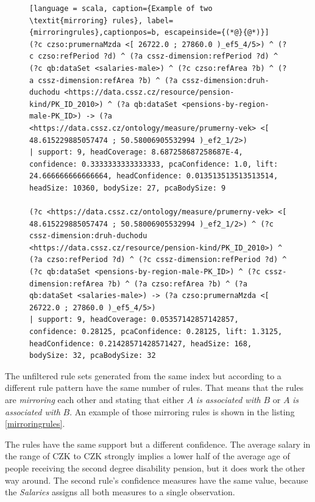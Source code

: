 \begin{figure}[h]
\begin{lstlisting}[language = scala, caption={Example of two \textit{mirroring} rules}, label={mirroringrules},captionpos=b, escapeinside={(*@}{@*)}]
(?c czso:prumernaMzda <[ 26722.0 ; 27860.0 )_ef5_4/5>) ^ (?c czso:refPeriod ?d) ^ (?a cssz-dimension:refPeriod ?d) ^ (?c qb:dataSet <salaries-male>) ^ (?c czso:refArea ?b) ^ (?a cssz-dimension:refArea ?b) ^ (?a cssz-dimension:druh-duchodu <https://data.cssz.cz/resource/pension-kind/PK_ID_2010>) ^ (?a qb:dataSet <pensions-by-region-male-PK_ID>) -> (?a <https://data.cssz.cz/ontology/measure/prumerny-vek> <[ 48.615229885057474 ; 50.58006905532994 )_ef2_1/2>)
| support: 9, headCoverage: 8.687258687258687E-4, confidence: 0.3333333333333333, pcaConfidence: 1.0, lift: 24.666666666666664, headConfidence: 0.013513513513513514, headSize: 10360, bodySize: 27, pcaBodySize: 9
    
(?c <https://data.cssz.cz/ontology/measure/prumerny-vek> <[ 48.615229885057474 ; 50.58006905532994 )_ef2_1/2>) ^ (?c cssz-dimension:druh-duchodu <https://data.cssz.cz/resource/pension-kind/PK_ID_2010>) ^ (?a czso:refPeriod ?d) ^ (?c cssz-dimension:refPeriod ?d) ^ (?c qb:dataSet <pensions-by-region-male-PK_ID>) ^ (?c cssz-dimension:refArea ?b) ^ (?a czso:refArea ?b) ^ (?a qb:dataSet <salaries-male>) -> (?a czso:prumernaMzda <[ 26722.0 ; 27860.0 )_ef5_4/5>) 
| support: 9, headCoverage: 0.05357142857142857, confidence: 0.28125, pcaConfidence: 0.28125, lift: 1.3125, headConfidence: 0.21428571428571427, headSize: 168, bodySize: 32, pcaBodySize: 32
\end{lstlisting}
\end{figure}

The unfiltered rule sets generated from the same index but according to a different rule pattern have the same number of rules. That means that the rules are \textit{mirroring} each other and stating that either $A$ \textit{is associated with} $B$ or $A$ \textit{is associated with} $B$. An example of those mirroring rules is shown in the listing \ref{mirroringrules}.

The rules have the same support but a different confidence. The average salary in the range of  CZK to  CZK strongly implies a lower half of the average age of people receiving the second degree disability pension, but it does work the other way around. The second rule's confidence measures have the same value, because the \textit{Salaries} assigns all both measures to a single observation.